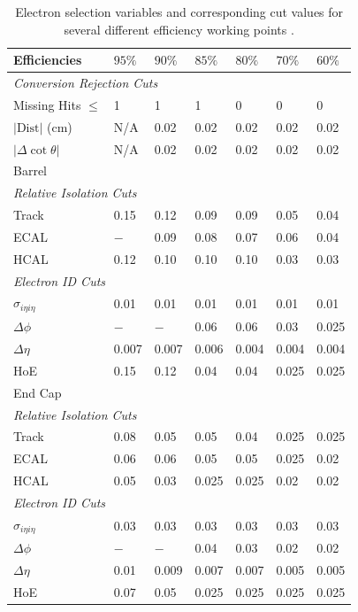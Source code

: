 \begin{table}[htbp]
  \begin{center}
    \begin{tabular}{lllllll} 
\toprule
Efficiencies& $95\%$& $90\%$& $85\%$& $80\%$& $70\%$& $60\%$\\
\midrule
\multicolumn{7}{l}{\emph{Conversion Rejection Cuts}}\\ 
Missing Hits $\leq$& 1& 1& 1& 0& 0& 0\\
$\vert \text{Dist} \vert$ (cm) & N/A& 0.02& 0.02& 0.02& 0.02& 0.02\\
$\vert\Delta\cot\theta\vert$& N/A& 0.02& 0.02& 0.02& 0.02& 0.02\\
\midrule
\multicolumn{7}{l}{Barrel}\\ 
\multicolumn{7}{l}{\emph{Relative Isolation Cuts}} \\
Track    & 0.15& 0.12& 0.09& 0.09& 0.05& 0.04\\
ECAL     & $-$ & 0.09& 0.08& 0.07& 0.06& 0.04\\
HCAL     & 0.12& 0.10& 0.10& 0.10& 0.03& 0.03\\
\multicolumn{7}{l}{\emph{Electron ID Cuts}} \\
$\sigma_{i\eta i\eta}$& 0.01& 0.01& 0.01& 0.01& 0.01& 0.01\\
$\Delta \phi$& $-$ & $-$ & 0.06& 0.06& 0.03& 0.025\\
$\Delta \eta$& 0.007& 0.007& 0.006& 0.004& 0.004& 0.004\\
HoE& 0.15& 0.12& 0.04& 0.04& 0.025& 0.025\\
\midrule
\multicolumn{7}{l}{End Cap}\\ 
\multicolumn{7}{l}{\emph{Relative Isolation Cuts}} \\
Track    & 0.08& 0.05& 0.05& 0.04& 0.025& 0.025\\
ECAL     & 0.06& 0.06& 0.05& 0.05& 0.025& 0.02\\
HCAL     & 0.05& 0.03& 0.025& 0.025& 0.02& 0.02\\
\multicolumn{7}{l}{\emph{Electron ID Cuts}} \\
$\sigma_{i\eta i\eta}$& 0.03& 0.03& 0.03& 0.03& 0.03& 0.03\\
$\Delta \phi$& $-$ & $-$ & 0.04& 0.03& 0.02& 0.02\\
$\Delta \eta$& 0.01& 0.009& 0.007& 0.007& 0.005& 0.005\\
HoE& 0.07& 0.05& 0.025& 0.025& 0.025& 0.025\\
\bottomrule
    \end{tabular}
    \caption{Electron selection variables and
corresponding cut values for several different efficiency working points
\cite{nikos,daskalakis2009data,simplecutbasedeleid}.\label{tab:electronwp} }
  \end{center}
\end{table}

